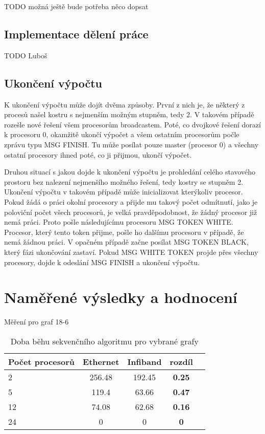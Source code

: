 \documentclass[]{article}
\begin{document}
TODO možná ještě bude potřeba něco dopsat

\subsection{Implementace dělení práce}

TODO Luboš

\subsection{Ukončení výpočtu}

K ukončení výpočtu může dojít dvěma způsoby. První z nich je, že některý z procesů našel kostru s nejmenším možným stupněm, tedy 2. V takovém případě rozešle nové řešení všem procesorům broadcastem. Poté, co dvojkové řešení dorazí k procesoru 0, okamžitě ukončí výpočet a všem ostatním procesorům počle zprávu typu MSG FINISH. Tu může posílat pouze master (procesor 0) a všechny ostatní procesory ihned poté, co ji přijmou, ukončí výpočet.

Druhou situací s jakou dojde k ukončení výpočtu je prohledání celého stavového prostoru bez nalezení nejmenšího možného řešení, tedy kostry se stupněm 2. Ukončení výpočtu v takovém případě může inicializovat kterýkoliv procesor. Pokud žádá o práci okolní procesory a přijde mu takový počet odmítnutí, jako je poloviční počet všech procesorů, je velká pravděpodobnost, že žádný procesor již nemá práci. Proto pošle následujícímu procesoru MSG TOKEN WHITE. Procesor, který tento token přijme, pošle ho dalšímu procesoru v případě, že nemá žádnou práci. V opačném případě začne posílat MSG TOKEN BLACK, který fázi ukončování zastaví. Pokud MSG WHITE TOKEN projde přes všechny procesory, dojde k odeslání MSG FINISH a ukončení výpočtu.

\section{Naměřené výsledky a hodnocení}

Měření pro graf 18-6

\begin{table}[ht]
\centering
\begin{tabular}{|l|c|c|c|c|}
\hline \textbf{Počet procesorů} & \textbf{Ethernet} & \textbf{Infiband} & \textbf{rozdíl} \\
\hline 
\hline 2 & 256.48 & 192.45 & \textbf{0.25} \\ 
\hline 5 & 119.4 & 63.66 & \textbf{0.47} \\ 
\hline 12 & 74.08 & 62.68 &  \textbf{0.16} \\ 
\hline 24 & 0 & 0 &  \textbf{0} \\ 
\hline 
\end{tabular}
\caption{Doba běhu sekvenčního algoritmu pro vybrané grafy}
\label{sekvencni_test}	
\end{table}
\end{document}
